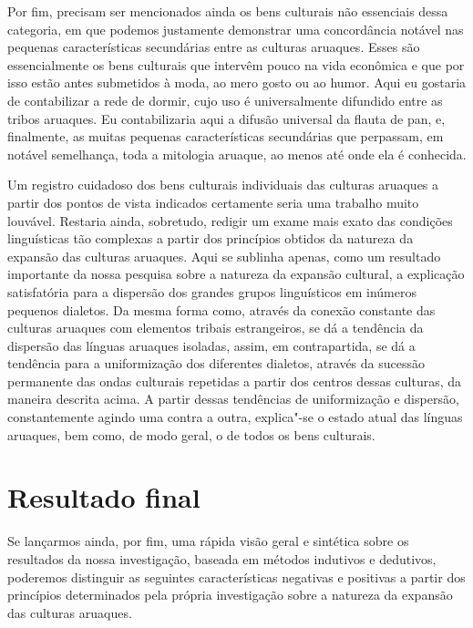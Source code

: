 Por fim, precisam ser mencionados ainda os bens culturais não essenciais
dessa categoria, em que podemos justamente demonstrar uma concordância
notável nas pequenas características secundárias entre as culturas
aruaques. Esses são essencialmente os bens culturais que intervêm pouco
na vida econômica e que por isso estão antes submetidos à moda, ao mero
gosto ou ao humor. Aqui eu gostaria de contabilizar a rede de dormir,
cujo uso é universalmente difundido entre as tribos aruaques. Eu
contabilizaria aqui a difusão universal da flauta de pan, e, finalmente,
as muitas pequenas características secundárias que perpassam, em notável
semelhança, toda a mitologia aruaque, ao menos até onde ela é conhecida.

Um registro cuidadoso dos bens culturais individuais das culturas
aruaques a partir dos pontos de vista indicados certamente seria uma
trabalho muito louvável. Restaria ainda, sobretudo, redigir um exame
mais exato das condições linguísticas tão complexas a partir dos
princípios obtidos da natureza da expansão das culturas aruaques. Aqui se
sublinha apenas, como um resultado importante da nossa pesquisa sobre a
natureza da expansão cultural, a explicação satisfatória para a
dispersão dos grandes grupos linguísticos em inúmeros pequenos dialetos.
Da mesma forma como, através da conexão constante das culturas aruaques
com elementos tribais estrangeiros, se dá a tendência da dispersão das
línguas aruaques isoladas, assim, em contrapartida, se dá a tendência
para a uniformização dos diferentes dialetos, através da sucessão
permanente das ondas culturais repetidas a partir dos centros dessas
culturas, da maneira descrita acima. A partir dessas tendências de
uniformização e dispersão, constantemente agindo uma contra a outra,
explica"-se o estado atual das línguas aruaques, bem como, de modo geral,
o de todos os bens culturais.

\chapter{Resultado final}

Se lançarmos ainda, por fim, uma rápida visão geral e sintética sobre os
resultados da nossa investigação, baseada em métodos indutivos e dedutivos, 
poderemos distinguir as seguintes características negativas e positivas a partir dos princípios
determinados pela própria investigação sobre a natureza da expansão das
culturas aruaques.

